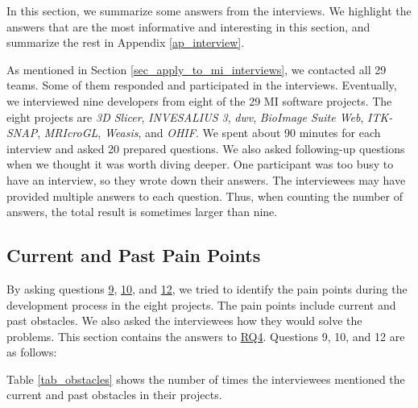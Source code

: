 \documentclass[3p, 12pt,authoryear]{elsarticle}
\begin{document}
In this section, we summarize some answers from the interviews. We highlight the
answers that are the most informative and interesting in this section, and
summarize the rest in Appendix \ref{ap_interview}.

As mentioned in Section \ref{sec_apply_to_mi_interviews}, we contacted all 29
teams. Some of them responded and participated in the interviews. Eventually, we
interviewed nine developers from eight of the 29 MI software projects. The eight
projects are \textit{3D Slicer}, \textit{INVESALIUS 3}, \textit{dwv},
\textit{BioImage Suite Web}, \textit{ITK-SNAP}, \textit{MRIcroGL},
\textit{Weasis}, and \textit{OHIF}. We spent about 90 minutes for each interview
and asked 20 prepared questions. We also asked following-up questions when we
thought it was worth diving deeper. One participant was too busy to have an
interview, so they wrote down their answers. The interviewees may have provided
multiple answers to each question. Thus, when counting the number of answers,
the total result is sometimes larger than nine.

\subsection{Current and Past Pain Points} \label{sec_interview_pain_points}

By asking questions \hyperlink{q9}{9}, \hyperlink{q10}{10}, and
\hyperlink{q12}{12}, we tried to identify the pain points during the development
process in the eight projects. The pain points include current and past
obstacles. We also asked the interviewees how they would solve the problems.
This section contains the answers to \hyperlink{rq4}{RQ4}. Questions 9, 10, and
12 are as follows:


Table \ref{tab_obstacles} shows the number of times the interviewees mentioned
the current and past obstacles in their projects.
\end{document}
